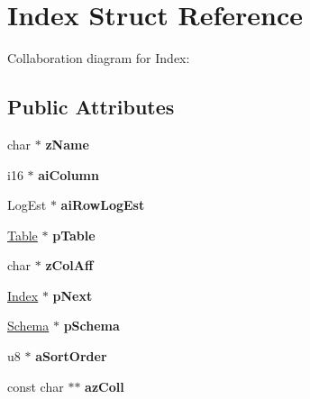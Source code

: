 \hypertarget{structIndex}{}\section{Index Struct Reference}
\label{structIndex}


Collaboration diagram for Index\+:
\subsection*{Public Attributes}
\begin{DoxyCompactItemize}
\item 
char $\ast$ {\bfseries z\+Name}\hypertarget{structIndex_a8848cddf6e09f22e3b794ec019082ced}{}\label{structIndex_a8848cddf6e09f22e3b794ec019082ced}

\item 
i16 $\ast$ {\bfseries ai\+Column}\hypertarget{structIndex_a62b5bf88f7c567f15e9a8c9da579d45c}{}\label{structIndex_a62b5bf88f7c567f15e9a8c9da579d45c}

\item 
Log\+Est $\ast$ {\bfseries ai\+Row\+Log\+Est}\hypertarget{structIndex_a830ea536e93022501262afe908bdd35c}{}\label{structIndex_a830ea536e93022501262afe908bdd35c}

\item 
\hyperlink{structTable}{Table} $\ast$ {\bfseries p\+Table}\hypertarget{structIndex_a01c6d4da27cba325ca58f333f87a6f44}{}\label{structIndex_a01c6d4da27cba325ca58f333f87a6f44}

\item 
char $\ast$ {\bfseries z\+Col\+Aff}\hypertarget{structIndex_af076df9f74dd836001c0a59d27274c0e}{}\label{structIndex_af076df9f74dd836001c0a59d27274c0e}

\item 
\hyperlink{structIndex}{Index} $\ast$ {\bfseries p\+Next}\hypertarget{structIndex_a115a17d236bd277d59dd5ea030954c3e}{}\label{structIndex_a115a17d236bd277d59dd5ea030954c3e}

\item 
\hyperlink{structSchema}{Schema} $\ast$ {\bfseries p\+Schema}\hypertarget{structIndex_af14f5ddd57eab2aba63dcb5db2aa92af}{}\label{structIndex_af14f5ddd57eab2aba63dcb5db2aa92af}

\item 
u8 $\ast$ {\bfseries a\+Sort\+Order}\hypertarget{structIndex_a0a3fc87b53193995f59c9657443e9a99}{}\label{structIndex_a0a3fc87b53193995f59c9657443e9a99}

\item 
const char $\ast$$\ast$ {\bfseries az\+Coll}\hypertarget{structIndex_a04f01be3e98aabc4a0516a2fbf28fae1}{}\label{structIndex_a04f01be3e98aabc4a0516a2fbf28fae1}


\end{DoxyCompactItemize}
